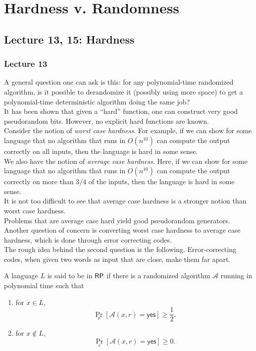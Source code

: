 \section{Hardness v. Randomness}

\subsection{Lecture 13, 15: Hardness}

	\subsubsection{Lecture 13}

		A general question one can ask is this: for any polynomial-time randomized algorithm, is it possible to derandomize it (possibly using more space) to get a polynomial-time deterministic algorithm doing the same job?\\
		It has been shown that given a ``hard'' function, one can construct very good pseudorandom bits. However, no explicit hard functions are known.\\

		Consider the notion of \emph{worst case hardness}. For example, if we can show for some language that no algorithm that runs in $O(n^{10})$ can compute the output correctly on all inputs, then the language is hard in some sense.\\
		We also have the notion of \emph{average case hardness}. Here, if we can show for some language that no algorithm that runs in $O(n^{10})$ can compute the output correctly on more than $3/4$ of the inputs, then the language is hard in some sense.\\
		It is not too difficult to see that average case hardness is a stronger notion than worst case hardness.\\

		Problems that are average case hard yield good pseudorandom generators. Another question of concern is converting worst case hardness to average case hardness, which is done through error correcting codes.\\
		The rough idea behind the second question is the following. Error-correcting codes, when given two words as input that are close, make them far apart.

		\begin{fdef}[$\RP$]
			A language $L$ is said to be in $\RP$ if there is a randomized algorithm $\mathcal{A}$ running in polynomial time such that
			\begin{enumerate}
				\item for $x \in L$,
				\[ \Pr_{r} \left[\mathcal{A}(x,r) = \mathsf{yes}\right] \ge \frac{1}{2}. \]
				\item for $x \not\in L$,
				\[ \Pr_{r} \left[\mathcal{A}(x,r) = \mathsf{yes}\right] \ge 0. \]
			\end{enumerate}
		\end{fdef}

